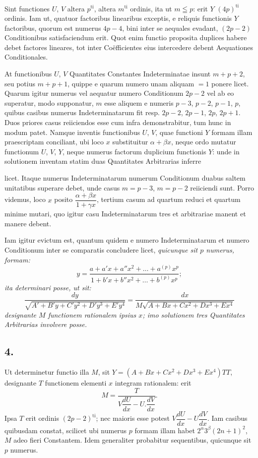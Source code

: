 \documentclass{article}
\begin{document}
Sint functiones $U$, $V$ altera $p^{\mathrm{ti}}$, altera $m^{\mathrm{ti}}$ ordinis, ita ut $m\leqq p$: erit $Y$ $(4p)^{\mathrm{ti}}$ ordinis. Iam ut, quatuor factoribus linearibus exceptis, e reliquis functionis $Y$ factoribus, quorum est numerus $4p-4$, bini inter se aequales evadant, $(2p-2)$ Conditionibus satisfaciendum erit. Quot enim functio proposita duplices habere debet factores lineares, tot inter Coëfficientes eius intercedere debent Aequationes Conditionales.

At functionibus $U$, $V$ Quantitates Constantes Indeterminatae insunt $m+p+2$, seu potius $m+p+1$, quippe e quarum numero unam aliquam $=1$ ponere licet. Quarum igitur numerus vel aequatur numero Conditionum $2p-2$ vel ab eo superatur, modo supponatur, $m$ esse aliquem e numeris $p-3$, $p-2$, $p-1$, $p$, quibus casibus numerus Indeterminatarum fit resp. $2p-2$, $2p-1$, $2p$, $2p+1$. Duos priores casus reiiciendos esse cum infra demonstrabitur, tum hunc in modum patet. Namque inventis functionibus $U$, $V$, quae functioni $Y$ formam illam praescriptam conciliant, ubi loco $x$ substituitur $\alpha+\beta x$, neque ordo mutatur functionum $U$, $V$, $Y$, neque numerus factorum duplicium functionis $Y$: unde in solutionem inventam statim duas Quantitates Arbitrarias inferre

licet. Itaque numerus Indeterminatarum numerum Conditionum duabus saltem unitatibus superare debet, unde casus $m=p-3$, $m=p-2$ reiiciendi sunt. Porro videmus, loco $x$ posito $\dfrac{\alpha+\beta x}{1+\gamma x}$, tertium casum ad quartum reduci et quartum minime mutari, quo igitur casu Indeterminatarum tres et arbitrariae manent et manere debent.

Iam igitur evictum est, quantum quidem e numero Indeterminatarum et numero Conditionum inter se comparatis concludere licet, \emph{quicunque sit $p$ numerus, formam:}
\[
y=\frac{a+a'x+a''x^{2}+\ldots+a^{(p)}x^{p}}{1+b'x+b''x^{2}+\ldots+b^{(p)}x^{p}};
\]
\emph{ita determinari posse, ut sit:}
\[
\frac{dy}{\sqrt{A'+B'y+C'y^{2}+D'y^{3}+E'y^{4}}}=\frac{dx}{M\sqrt{A+Bx+Cx^{2}+Dx^{3}+Ex^{4}}}
\]
\emph{designante $M$ functionem rationalem ipsius $x$; imo solutionem tres Quantitates Arbitrarias involvere posse.}

\subsection*{4.}

Ut determinetur functio illa $M$, sit $Y=(A+Bx+Cx^{2}+Dx^{3}+Ex^{4})TT$, designante $T$ functionem elementi $x$ integram rationalem: erit
\[
M=\frac{T}{V\dfrac{dU}{dx}-U.\dfrac{dV}{dx}}.
\]
Ipsa $T$ erit ordinis $(2p-2)^{\mathrm{ti}}$; nec maioris esse potest $V\dfrac{dU}{dx}-U\dfrac{dV}{dx}$. Iam casibus quibusdam constat, scilicet ubi numerus $p$ formam illam habet $2^{\alpha}3^{\beta}(2n+1)^{2}$, $M$ adeo fieri Constantem. Idem generaliter probabitur sequentibus, quicunque sit $p$ numerus.
\end{document}
